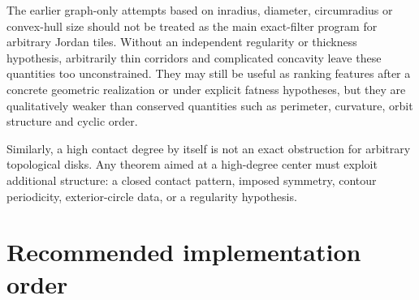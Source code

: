\documentclass[11pt]{article}
\theoremstyle{definition}
\theoremstyle{remark}
\begin{document}
The earlier graph-only attempts based on inradius, diameter, circumradius or convex-hull size should not be treated as the main exact-filter program for arbitrary Jordan tiles.  Without an independent regularity or thickness hypothesis, arbitrarily thin corridors and complicated concavity leave these quantities too unconstrained.  They may still be useful as ranking features after a concrete geometric realization or under explicit fatness hypotheses, but they are qualitatively weaker than conserved quantities such as perimeter, curvature, orbit structure and cyclic order.

Similarly, a high contact degree by itself is not an exact obstruction for arbitrary topological disks.  Any theorem aimed at a high-degree center must exploit additional structure: a closed contact pattern, imposed symmetry, contour periodicity, exterior-circle data, or a regularity hypothesis.

\section{Recommended implementation order}
\end{document}
